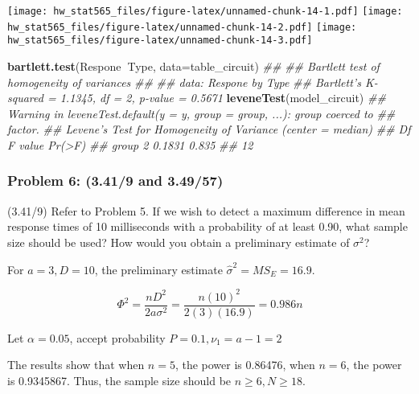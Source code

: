 \documentclass[]{article}
\newenvironment{Shaded}{\begin{snugshade}}{\end{snugshade}}
\newcommand{\CommentTok}[1]{\textcolor[rgb]{0.56,0.35,0.01}{\textit{#1}}}
\newcommand{\DataTypeTok}[1]{\textcolor[rgb]{0.13,0.29,0.53}{#1}}
\newcommand{\KeywordTok}[1]{\textcolor[rgb]{0.13,0.29,0.53}{\textbf{#1}}}
\newcommand{\NormalTok}[1]{#1}
\newcommand{\OperatorTok}[1]{\textcolor[rgb]{0.81,0.36,0.00}{\textbf{#1}}}
\begin{document}
\texttt{[image: hw\_stat565\_files/figure-latex/unnamed-chunk-14-1.pdf]}
\texttt{[image: hw\_stat565\_files/figure-latex/unnamed-chunk-14-2.pdf]}
\texttt{[image: hw\_stat565\_files/figure-latex/unnamed-chunk-14-3.pdf]}

\begin{Shaded}
\begin{Highlighting}[]
\KeywordTok{bartlett.test}\NormalTok{(Respone}\OperatorTok{~}\NormalTok{Type, }\DataTypeTok{data=}\NormalTok{table_circuit)}
\CommentTok{## }
\CommentTok{##  Bartlett test of homogeneity of variances}
\CommentTok{## }
\CommentTok{## data:  Respone by Type}
\CommentTok{## Bartlett's K-squared = 1.1345, df = 2, p-value = 0.5671}
\KeywordTok{leveneTest}\NormalTok{(model_circuit)}
\CommentTok{## Warning in leveneTest.default(y = y, group = group, ...): group coerced to}
\CommentTok{## factor.}
\CommentTok{## Levene's Test for Homogeneity of Variance (center = median)}
\CommentTok{##       Df F value Pr(>F)}
\CommentTok{## group  2  0.1831  0.835}
\CommentTok{##       12}
\end{Highlighting}
\end{Shaded}

\hypertarget{problem-6-3.419-and-3.4957}{%
\subsubsection{Problem 6: (3.41/9 and
3.49/57)}\label{problem-6-3.419-and-3.4957}}

(3.41/9) Refer to Problem 5. If we wish to detect a maximum difference
in mean response times of 10 milliseconds with a probability of at least
0.90, what sample size should be used? How would you obtain a
preliminary estimate of \(σ^2\)?

For \(a=3, D=10\), the preliminary estimate \(\hat\sigma^2=MS_E=16.9\).

\[Φ^2=\frac{nD^2}{2aσ^2}=\frac{n(10)^2}{2(3)(16.9)}=0.986n\]

Let \(α=0.05\), accept probability \(P=0.1,\nu_1=a−1=2\)

The results show that when \(n=5\), the power is 0.86476, when \(n=6\),
the power is 0.9345867. Thus, the sample size should be
\(n\ge6, N\ge18\).
\end{document}
